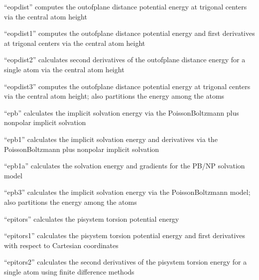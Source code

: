 \documentclass[letterpaper,11pt,english]{sphinxmanual}
\begin{document}
“eopdist” computes the out\sphinxhyphen{}of\sphinxhyphen{}plane distance potential
energy at trigonal centers via the central atom height


“eopdist1” computes the out\sphinxhyphen{}of\sphinxhyphen{}plane distance potential
energy and first derivatives at trigonal centers via
the central atom height


“eopdist2” calculates second derivatives of the out\sphinxhyphen{}of\sphinxhyphen{}plane
distance energy for a single atom via the central atom height


“eopdist3” computes the out\sphinxhyphen{}of\sphinxhyphen{}plane distance potential energy
at trigonal centers via the central atom height; also partitions
the energy among the atoms


“epb” calculates the implicit solvation energy via the
Poisson\sphinxhyphen{}Boltzmann plus nonpolar implicit solvation


“epb1” calculates the implicit solvation energy and derivatives
via the Poisson\sphinxhyphen{}Boltzmann plus nonpolar implicit solvation


“epb1a” calculates the solvation energy and gradients for the
PB/NP solvation model


“epb3” calculates the implicit solvation energy via the
Poisson\sphinxhyphen{}Boltzmann model; also partitions the energy among
the atoms


“epitors” calculates the pi\sphinxhyphen{}system torsion potential energy


“epitors1” calculates the pi\sphinxhyphen{}system torsion potential energy
and first derivatives with respect to Cartesian coordinates


“epitors2” calculates the second derivatives of the pi\sphinxhyphen{}system
torsion energy for a single atom using finite difference methods
\end{document}
